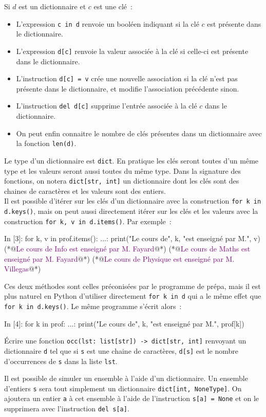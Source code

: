 \documentclass{magnolia}
\begin{document}
Si $d$ est un dictionnaire et $c$ est une clé~:
\begin{itemize}
\item L'expression \verb!c in d! renvoie un booléen indiquant si la clé $c$ est présente dans le dictionnaire.
\item L'expression \verb!d[c]! renvoie la valeur associée à la clé si celle-ci est présente dans le dictionnaire.
\item L'instruction \verb!d[c] = v! crée une nouvelle association si la clé n'est pas présente dans le
  dictionnaire, et modifie l'association précédente sinon.
\item L'instruction \verb!del d[c]! supprime l'entrée associée à la clé $c$ dans le dictionnaire.
\item On peut enfin connaitre le nombre de clés présentes dans un
  dictionnaire avec la fonction \verb!len(d)!.
\end{itemize}

Le type d'un dictionnaire est \verb!dict!. En pratique les clés seront toutes d'un même type et les valeurs
seront aussi toutes du même type. Dans la signature des fonctions, on notera \verb!dict[str, int]! un dictionnaire
dont les clés sont des chaines de caractères et les valeurs sont des entiers.\\

Il est possible d'itérer sur les clés d'un dictionnaire avec la construction
\verb!for k in d.keys()!, mais on peut aussi directement itérer sur les clés et les
valeurs avec la construction \verb!for k, v in d.items()!. Par exemple~:
\begin{pythoncode}
In [3]: for k, v in prof.items():
   ...:     print("Le cours de", k, "est enseigné par M.",  v)
(*@\textcolor{purple}{Le cours de Info est enseigné par M. Fayard}@*)
(*@\textcolor{purple}{Le cours de Maths est enseigné par M. Fayard}@*)
(*@\textcolor{purple}{Le cours de Physique est enseigné par M. Villegas}@*)
\end{pythoncode}
Ces deux méthodes sont celles préconisées par le programme de prépa, mais il est plus naturel
en Python d'utiliser directement \verb!for k in d! qui a le même effet que
\verb!for k in d.keys()!. Le même programme s'écrit alors~:
\begin{pythoncode}
In [4]: for k in prof:
   ...:     print("Le cours de", k, "est enseigné par M.",  prof[k])
\end{pythoncode}
\vspace{2ex}
\begin{exoUnique}
\exo Écrire une fonction \verb!occ(lst: list[str]) -> dict[str, int]! renvoyant un dictionnaire \verb!d! tel
  que si \verb!s! est une chaine de caractères, \verb!d[s]! est le nombre d'occurrences de \verb!s! dans la liste
  \verb!lst!.
\end{exoUnique}
\vspace{2ex}
Il est possible de simuler un ensemble à l'aide d'un dictionnaire. Un ensemble d'entiers \verb!s! sera tout
simplement un dictionnaire \verb!dict[int, NoneType]!. On ajoutera un entier \verb!a! à cet ensemble
à l'aide de l'instruction \verb!s[a] = None! et on le supprimera avec l'instruction
\verb!del s[a]!.



\end{document}
